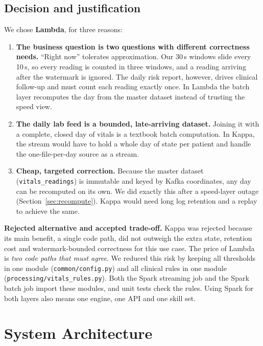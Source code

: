 \documentclass[11pt,a4paper]{article}
\newcommand{\code}[1]{\nolinkurl{#1}}
\begin{document}
\subsection{Decision and justification}
We chose \textbf{Lambda}, for three reasons:
\begin{enumerate}
  \item \textbf{The business question is two questions with different correctness needs.}
  ``Right now'' tolerates approximation. Our 30\,s windows slide every 10\,s, so every reading
  is counted in three windows, and a reading arriving after the watermark is ignored. The daily
  risk report, however, drives clinical follow-up and must count each reading exactly once. In
  Lambda the batch layer recomputes the day from the master dataset instead of trusting the
  speed view.
  \item \textbf{The daily lab feed is a bounded, late-arriving dataset.} Joining it with a
  complete, closed day of vitals is a textbook batch computation. In Kappa, the stream would have
  to hold a whole day of state per patient and handle the one-file-per-day source as a stream.
  \item \textbf{Cheap, targeted correction.} Because the master dataset
  (\code{vitals_readings}) is immutable and keyed by Kafka coordinates, any day can be recomputed
  on its own. We did exactly this after a speed-layer outage (Section~\ref{sec:recompute}).
  Kappa would need long log retention and a replay to achieve the same.
\end{enumerate}

\textbf{Rejected alternative and accepted trade-off.} Kappa was rejected because its main
benefit, a single code path, did not outweigh the extra state, retention cost and
watermark-bounded correctness for this use case. The price of Lambda is \emph{two code paths
that must agree}. We reduced this risk by keeping all thresholds in one module
(\code{common/config.py}) and all clinical rules in one module (\code{processing/vitals_rules.py}).
Both the Spark streaming job and the Spark batch job import these modules, and unit tests check
the rules. Using Spark for both layers also means one engine, one API and one skill set.

\section{System Architecture}
\end{document}
